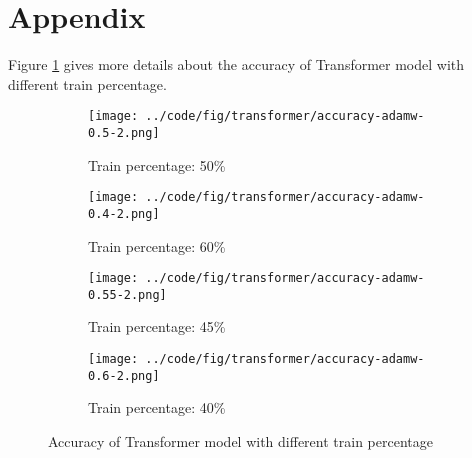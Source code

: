 \documentclass{article}
\begin{document}
\newpage

\appendix

\section{Appendix}

Figure \ref{fig:transformer-accuracy-all} gives more details about the accuracy of Transformer model with different train percentage.

\begin{figure}[ht]
    \centering
    \begin{subfigure}{0.45\textwidth}
        \texttt{[image: ../code/fig/transformer/accuracy-adamw-0.5-2.png]}
        \caption{Train percentage: 50\%}
    \end{subfigure}
    \begin{subfigure}{0.45\textwidth}
        \texttt{[image: ../code/fig/transformer/accuracy-adamw-0.4-2.png]}
        \caption{Train percentage: 60\%}
    \end{subfigure}
    \begin{subfigure}{0.45\textwidth}
        \texttt{[image: ../code/fig/transformer/accuracy-adamw-0.55-2.png]}
        \caption{Train percentage: 45\%}
    \end{subfigure}
    \begin{subfigure}{0.45\textwidth}
        \texttt{[image: ../code/fig/transformer/accuracy-adamw-0.6-2.png]}
        \caption{Train percentage: 40\%}
    \end{subfigure}
    \caption{Accuracy of Transformer model with different train percentage}
    \label{fig:transformer-accuracy-all}
\end{figure}



\end{document}
